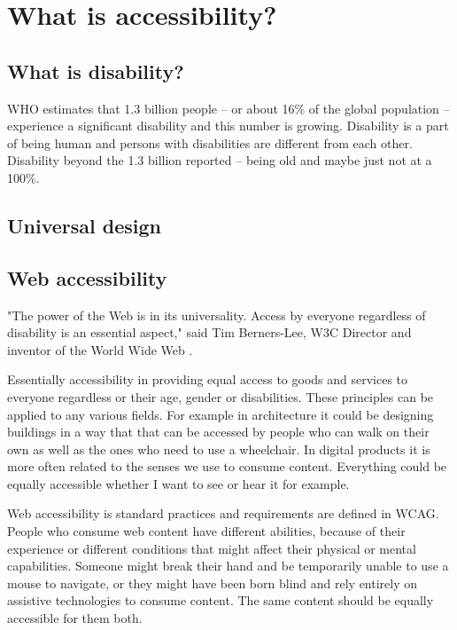 \documentclass{master_thesis_section}
\begin{document}
\section{What is accessibility?}

\subsection{What is disability?}
WHO estimates that 1.3 billion people – or about 16\% of the global population – experience a significant disability and this number is growing. Disability is a part of being human and persons with disabilities are different from each other. \citep{WHODisability2022} \\
Disability beyond the 1.3 billion reported – being old and maybe just not at a 100\%. \citep{}

\subsection{Universal design}
\subsection{Web accessibility}

"The power of the Web is in its universality. Access by everyone regardless of disability is an essential aspect," said Tim Berners-Lee, W3C Director and inventor of the World Wide Web \citep{WWWconsortium1997}.

Essentially accessibility in providing equal access to goods and services to everyone regardless or their age, gender or disabilities. These principles can be applied to any various fields. For example in architecture it could be designing buildings in a way that that can be accessed by people who can walk on their own as well as the ones who need to use a wheelchair. In digital products it is more often related to the senses we use to consume content. Everything could be equally accessible whether I want to see or hear it for example.

Web accessibility is standard practices and requirements are defined in WCAG. People who consume web content have different abilities, because of their experience or different conditions that might affect their physical or mental capabilities. Someone might break their hand and be temporarily unable to use a mouse to navigate, or they might have been born blind and rely entirely on assistive technologies to consume content. The same content should be equally accessible for them both.
\end{document}
